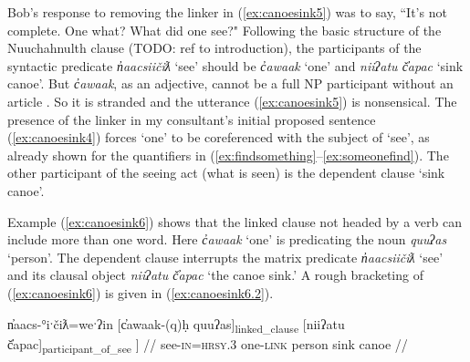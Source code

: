 Bob's response to removing the linker in (\ref{ex:canoesink5}) was to say, ``It's not complete. One what? What did one see?" Following the basic structure of the Nuuchahnulth clause (TODO: ref to introduction), the participants of the syntactic predicate \textit{n̓aacsiičiƛ} `see' should be \textit{c̓awaak} `one' and \textit{niiʔatu č̓apac} `sink canoe'. But \textit{c̓awaak}, as an adjective, cannot be a full NP participant without an article \citep{wojdak2001}. So it is stranded and the utterance (\ref{ex:canoesink5}) is nonsensical. The presence of the linker in my consultant's initial proposed sentence (\ref{ex:canoesink4}) forces `one' to be coreferenced with the subject of `see', as already shown for the quantifiers in (\ref{ex:findsomething}--\ref{ex:someonefind}). The other participant of the seeing act (what is seen) is the dependent clause `sink canoe'.

Example (\ref{ex:canoesink6}) shows that the linked clause not headed by a verb can include more than one word. Here \textit{c̓awaak} `one' is predicating the noun \textit{quuʔas} `person'. The dependent clause interrupts the matrix predicate \textit{n̓aacsiičiƛ} `see' and its clausal object \textit{niiʔatu č̓apac} `the canoe sink.' A rough bracketing of (\ref{ex:canoesink6}) is given in (\ref{ex:canoesink6.2}).

\ex \label{ex:canoesink6.2}
\begingl
\gla {[}n̓aacs-°iˑčiƛ=weˑʔin {[}c̓awaak-(q)ḥ quuʔas{]\textsubscript{linked\_clause}} {[}niiʔatu č̓apac{]\textsubscript{participant\_of\_see} ]} //
\glb see-\textsc{in}=\textsc{hrsy.3} one-\textsc{link} person sink canoe //
\endgl
\xe

